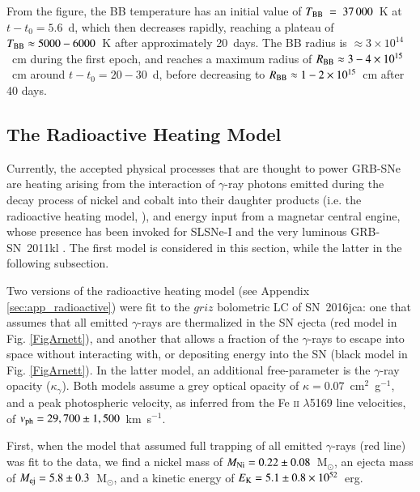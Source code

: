 \documentclass[traditabstract,longauth]{aa}
\begin{document}
From the figure, the BB temperature has an initial value of $T_{\rm BB}~=~37\,000$~K at $t-t_0=5.6$~d, which then decreases rapidly, reaching a plateau of $T_{\rm BB} \approx 5000-6000$~K after approximately 20~days.  The BB radius is $\approx 3\times10^{14}$~cm during the first epoch, and reaches a maximum radius of $R_{\rm BB} \approx 3-4\times10^{15}$~cm around $t-t_0=20-30$~d, before decreasing to $R_{\rm BB} \approx 1-2\times10^{15}$~cm after 40 days.



 
\subsection{The Radioactive Heating Model}







Currently, the accepted physical processes that are thought to power GRB-SNe are heating arising from the interaction of $\gamma$-ray photons emitted during the decay process of nickel and cobalt into their daughter products (i.e. the radioactive heating model, \citealt{Arnett1982}), and energy input from a magnetar central engine, whose presence has been invoked for SLSNe-I and the very luminous GRB-SN~2011kl \citep{Greiner15}.  The first model is considered in this section, while the latter in the following subsection.

Two versions of the radioactive heating model (see Appendix \ref{sec:app_radioactive}) were fit to the $griz$ bolometric LC of SN~2016jca: one that assumes that all emitted $\gamma$-rays are thermalized in the SN ejecta (red model in Fig. \ref{FigArnett}), and another that allows a fraction of the $\gamma$-rays to escape into space without interacting with, or depositing energy into the SN (black model in Fig. \ref{FigArnett}).  In the latter model, an additional free-parameter is the $\gamma$-ray opacity ($\kappa_{\gamma}$).  Both models assume a grey optical opacity of $\kappa = 0.07$~cm$^2$~g$^{-1}$, and a peak photospheric velocity, as inferred from the Fe \textsc{ii} $\lambda$5169 line velocities, of $v_{\rm ph} = 29,700\pm1,500$~km~s$^{-1}$.

First, when the model that assumed full trapping of all emitted $\gamma$-rays (red line) was fit to the data, we find a nickel mass of $M_{\rm Ni} = 0.22\pm0.08$~M$_{\odot}$, an ejecta mass of $M_{\rm ej} = 5.8\pm0.3$~M$_{\odot}$, and a kinetic energy of $E_{\rm K} = 5.1\pm0.8\times10^{52}$~erg.
\end{document}
